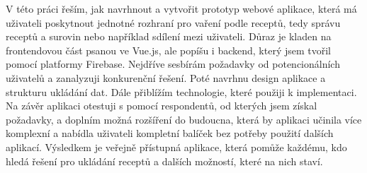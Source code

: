 
V této práci řeším, jak navrhnout a vytvořit prototyp webové aplikace, která má uživateli poskytnout jednotné rozhraní
pro vaření podle receptů, tedy správu receptů a surovin nebo například sdílení mezi uživateli.
Důraz je kladen na frontendovou část psanou ve Vue.js, ale popíšu i backend, který jsem tvořil pomocí platformy Firebase.
Nejdříve sesbírám požadavky od potencionálních uživatelů a zanalyzuji konkurenční řešení. Poté navrhnu design aplikace a
strukturu ukládání dat. Dále přiblížím technologie, které použiji k implementaci.
Na závěr aplikaci otestuji s pomocí respondentů, od kterých jsem získal požadavky, a doplním možná rozšíření do budoucna,
která by aplikaci učinila více komplexní a nabídla uživateli kompletní balíček bez potřeby použití dalších aplikací.
Výsledkem je veřejně přístupná aplikace, která pomůže každému, kdo hledá řešení pro ukládání receptů a dalších možností, které na nich staví.
